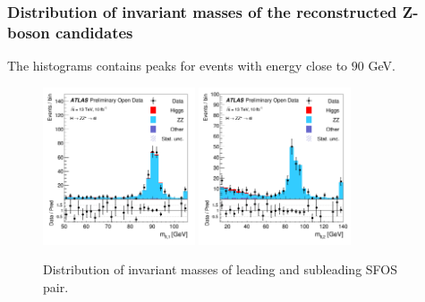 \documentclass[aspectratio=1610, english]{beamer}
\begin{document}
\begin{frame}
\frametitle{Distribution of invariant masses of the reconstructed Z-boson candidates}

The histograms contains peaks for events with energy close to $90$ GeV.

\begin{figure} [H]
\centering
\includegraphics[width=0.4\textwidth]{hist_mLL1.png}
\includegraphics[width=0.4\textwidth]{hist_mLL2.png}
\caption{Distribution of invariant masses of leading and subleading SFOS pair. }
\end{figure}

\end{frame}
\end{document}
